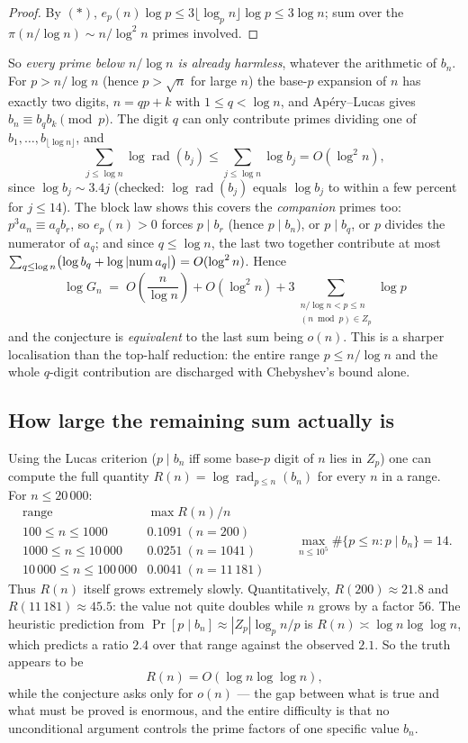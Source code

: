 \begin{proof}
By $(\ast)$, $e_p(n)\log p\le3\lfloor\log_p n\rfloor\log p\le3\log n$; sum over the
$\pi(n/\log n)\sim n/\log^2n$ primes involved.
\end{proof}

So \emph{every prime below $n/\log n$ is already harmless}, whatever the arithmetic of $b_n$.
For $p>n/\log n$ (hence $p>\sqrt n$ for large $n$) the base-$p$ expansion of $n$ has exactly
two digits, $n=qp+k$ with $1\le q<\log n$, and Ap\'ery--Lucas gives $b_n\equiv b_qb_k\pmod p$.
The digit $q$ can only contribute primes dividing one of $b_1,\dots,b_{\lfloor\log n\rfloor}$,
and
\[
  \sum_{j\le\log n}\log\operatorname{rad}(b_j)\le\sum_{j\le\log n}\log b_j=O(\log^2n),
\]
since $\log b_j\sim3.4j$ (checked: $\log\operatorname{rad}(b_j)$ equals $\log b_j$ to within a
few percent for $j\le14$).  The block law shows this covers the \emph{companion} primes too:
$p^3a_n\equiv a_qb_r$, so $e_p(n)>0$ forces $p\mid b_r$ (hence $p\mid b_n$), or $p\mid b_q$, or
$p$ divides the numerator of $a_q$; and since $q\le\log n$, the last two together contribute at
most $\sum_{q\le\log n}\bigl(\log b_q+\log|{\rm num}\,a_q|\bigr)=O(\log^2n)$.  Hence
\[
  \boxed{\;\log G_n\;=\;O\!\left(\frac n{\log n}\right)+O(\log^2n)
   +3\!\!\sum_{\substack{n/\log n<p\le n\\ (n\bmod p)\in Z_p}}\!\!\log p\;}
\]
and the conjecture is \emph{equivalent} to the last sum being $o(n)$.  This is a sharper
localisation than the top-half reduction: the entire range $p\le n/\log n$ and the whole
$q$-digit contribution are discharged with Chebyshev's bound alone.

\subsection{How large the remaining sum actually is}

Using the Lucas criterion ($p\mid b_n$ iff some base-$p$ digit of $n$ lies in $Z_p$) one can
compute the full quantity $R(n)=\log\operatorname{rad}_{p\le n}(b_n)$ for every $n$ in a
range.  For $n\le20\,000$:
\[
\begin{array}{c|c}
 \text{range}&\max R(n)/n\\ \hline
 100\le n\le1000&0.1091\ (n=200)\\
 1000\le n\le10\,000&0.0251\ (n=1041)\\
 10\,000\le n\le100\,000&0.0041\ (n=11\,181)
\end{array}
\qquad
\max_{n\le10^5}\#\{p\le n:p\mid b_n\}=14 .
\]
Thus $R(n)$ itself grows extremely slowly.  Quantitatively, $R(200)\approx21.8$ and
$R(11\,181)\approx45.5$: the value not quite doubles while $n$ grows by a factor $56$.  The
heuristic prediction from $\Pr[p\mid b_n]\approx|Z_p|\log_pn/p$ is
$R(n)\asymp\log n\log\log n$, which predicts a ratio $2.4$ over that range against the
observed $2.1$.  So the truth appears to be
\[
  R(n)=O(\log n\log\log n),
\]
while the conjecture asks only for $o(n)$ — the gap between what is true and what must be
proved is enormous, and the entire difficulty is that no unconditional argument controls the
prime factors of one specific value $b_n$.

